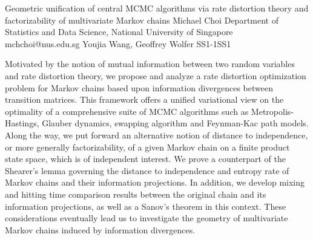\begin{talk}
  {Geometric unification of central MCMC algorithms via rate distortion theory and factorizability of multivariate Markov chains}%
  {Michael Choi}%
  {Department of Statistics and Data Science, National University of Singapore}%
  {mchchoi@nus.edu.sg}%
  {Youjia Wang, Geoffrey Wolfer}%
{}{}{SS1-1}{SS1}


Motivated by the notion of mutual information between two random variables and rate distortion theory, we propose and analyze a rate distortion optimization problem for Markov chains based upon information divergences between transition matrices. This framework offers a unified variational view on the optimality of a comprehensive suite of MCMC algorithms such as Metropolis-Hastings, Glauber dynamics, swapping algorithm and Feynman-Kac path models. Along the way, we put forward an alternative notion of distance to independence, or more generally factorizability, of a given Markov chain on a finite product state space, which is of independent interest. We prove a counterpart of the Shearer's lemma governing the distance to independence and entropy rate of Markov chains and their information projections. In addition, we develop mixing and hitting time comparison results between the original chain and its information projections, as well as a Sanov's theorem in this context. These considerations eventually lead us to investigate the geometry of multivariate Markov chains induced by information divergences.
\end{talk}

